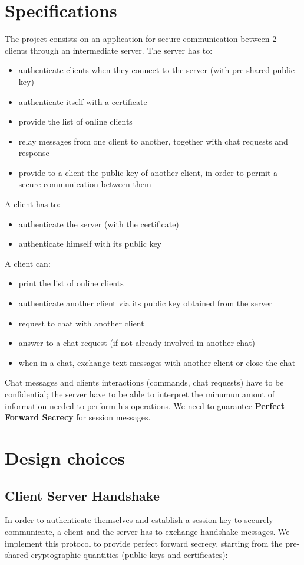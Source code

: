\documentclass[11pt]{report}
\begin{document}
\chapter{Specifications}
	\noindent The project consists on an application for secure communication between 2 clients through an intermediate server.
	\newline
	The server has to:
	\begin{itemize}
		\item authenticate clients when they connect to the server (with pre-shared public key)
		\item authenticate itself with a certificate
		\item provide the list of online clients
		\item relay messages from one client to another, together with chat requests and response
		\item provide to a client the public key of another client, in order to permit a secure communication between them
	\end{itemize}
	A client has to:
	\begin{itemize}
		\item authenticate the server (with the certificate)
		\item authenticate himself with its public key
	\end{itemize}
	A client can:
	\begin{itemize}
		\item print the list of online clients
		\item authenticate another client via its public key obtained from the server
		\item request to chat with another client
		\item answer to a chat request (if not already involved in another chat)
		\item when in a chat, exchange text messages with another client or close the chat
	\end{itemize}
	Chat messages and clients interactions (commands, chat requests) have to be confidential; the
	server have to be able to interpret the minumun amout of information needed to perform his operations.
	We need to guarantee \textbf{Perfect Forward Secrecy} for session messages.
\newpage
\chapter{Design choices}
\section{Client Server Handshake}
In order to authenticate themselves and establish a session key to securely communicate, a client
and the server has to exchange handshake messages. We implement this protocol to provide perfect 
forward secrecy, starting from the pre-shared cryptographic quantities (public keys and certificates):
\end{document}
